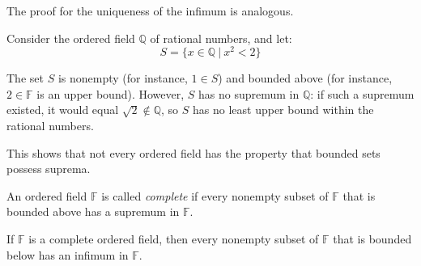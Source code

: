 The proof for the uniqueness of the infimum is analogous.

\begin{example}\label{ex:s-in-q-not-bounded}
Consider the ordered field $\mathbb{Q}$ of rational numbers, and let:
$$S = \{x \in \mathbb{Q} \ | \ x^2 < 2\}$$

The set $S$ is nonempty (for instance, $1 \in S$) and bounded above (for instance, $2 \in \mathbb{F}$ is an upper bound). However, $S$ has no supremum in $\mathbb{Q}$:  if such a supremum existed, it would equal $\sqrt{2} \notin \mathbb{Q}$, so $S$ has no least upper bound within the rational numbers.

This shows that not every ordered field has the property that bounded sets possess suprema.
\end{example}

\begin{definition}
An ordered field $\mathbb{F}$ is called \textit{complete} if every nonempty subset of $\mathbb{F}$ that is bounded above has a supremum in $\mathbb{F}$.
\end{definition}

\begin{proposition}
If $\mathbb{F}$ is a complete ordered field, then every nonempty subset of $\mathbb{F}$ that is bounded below has an infimum in $\mathbb{F}$.
\end{proposition}

